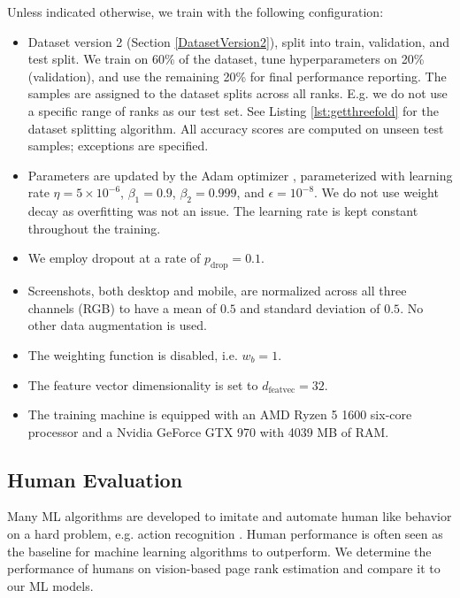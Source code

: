 Unless indicated otherwise, we train with the following configuration:
\begin{itemize}
    \item Dataset version 2 (Section \ref{DatasetVersion2}), split into train, validation, and test split. We train on 60\% of the dataset, tune hyperparameters on 20\% (validation), and use the remaining 20\% for final performance reporting. The samples are assigned to the dataset splits across all ranks. E.g. we do not use a specific range of ranks as our test set. See Listing \ref{lst:getthreefold} for the dataset splitting algorithm. All accuracy scores are computed on unseen test samples; exceptions are specified.
    \item Parameters are updated by the Adam optimizer \cite{kingma2014:adam}, parameterized with learning rate $\eta=5\times10^{-6}$, $\beta_1=0.9$, $\beta_2=0.999$, and $\epsilon=10^{-8}$. We do not use weight decay as overfitting was not an issue. The learning rate is kept constant throughout the training.
    \item We employ dropout \cite{srivastava2014:dropout} at a rate of $p_\text{drop}=0.1$.
    \item Screenshots, both desktop and mobile, are normalized across all three channels (RGB) to have a mean of $0.5$ and standard deviation of $0.5$. No other data augmentation is used.
    \item The weighting function is disabled, i.e. $w_b=1$.
    \item The feature vector dimensionality is set to $d_\text{featvec}=32$.
    \item The training machine is equipped with an AMD Ryzen 5 1600 six-core processor and a Nvidia GeForce GTX 970 with 4039 MB of RAM.
\end{itemize}

\subsection{Human Evaluation}

Many ML algorithms are developed to imitate and automate human like behavior on a hard problem, e.g. action recognition \cite{gu2018ava}. Human performance is often seen as the baseline for machine learning algorithms to outperform. We determine the performance of humans on vision-based page rank estimation and compare it to our ML models. 

